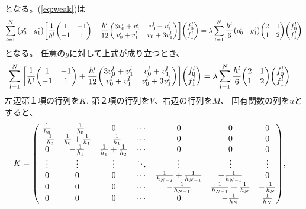 \documentclass[xelatex,ja=standard]{bxjsarticle}
\begin{document}
となる。(\ref{eq:weak})は
\begin{align}
    \sum_{l=1}^N \mqty(g^e_0 & g^e_1)\bigg[\frac{1}{h^l}\mqty(1 & -1 \\ -1 & 1)
     + \frac{h^l}{12}\mqty(3v_{0}^l +v_{1}^l & v_{0}^l +v_{1}^l\\ v_{0}^l +v_{1}^l&v_{0} +3v_{1}^l)\bigg]\mqty(f^l_0 \\ f^l_1)=\lambda\sum_{l=1}^N \frac{h^l}{6} \mqty(g^l_0 & g^l_1)\mqty(2 & 1\\1& 2)\mqty(f^l_0 \\ f^l_1)
\end{align}
となる。 任意の$g$に対して上式が成り立つとき、
\begin{align}
    \sum_{l=1}^N \bigg[\frac{1}{h^l}\mqty(1 & -1 \\ -1 & 1)
     + \frac{h^l}{12}\mqty(3v_{0}^l +v_{1}^l & v_{0}^l +v_{1}^l\\ v_{0}^l +v_{1}^l&v_{0}^l +3v_{1}^l)\bigg]\mqty(f^l_0 \\ f^l_1)&=\lambda\sum_{l=1}^N\frac{h^l}{6} \mqty(2 & 1\\1& 2)\mqty(f^l_0 \\ f^l_1)
\end{align}     
左辺第１項の行列を$K$, 第２項の行列を$V$、右辺の行列を$M$、 固有関数の列を$u$とすると、
\begin{align}
    K&=
     \mqty(
     \frac{1}{h_0} & -\frac{1}{h_0} & 0 & \cdots & 0 & 0 & 0 \\
     -\frac{1}{h_0} & \frac{1}{h_0} + \frac{1}{h_1} & -\frac{1}{h_1} & \cdots & 0 & 0 & 0 \\
     0 & -\frac{1}{h_1} & \frac{1}{h_1} + \frac{1}{h_2} & \cdots & 0 & 0 & 0 \\
     \vdots & \vdots & \vdots & \ddots & \vdots  & \vdots& \vdots\\
     0 & 0 & 0 & \cdots & \frac{1}{h_{N-2}} + \frac{1}{h_{N-1}} & -\frac{1}{h_{N-1}} & 0 \\
     0 & 0 & 0 & \cdots & -\frac{1}{h_{N-1}} &\frac{1}{h_{N-1}} + \frac{1}{h_N} & -\frac{1}{h_N} \\
     0 & 0 & 0 & \cdots & 0 & -\frac{1}{h_N}& \frac{1}{h_N} \\
     ),
\end{align}
\end{document}
